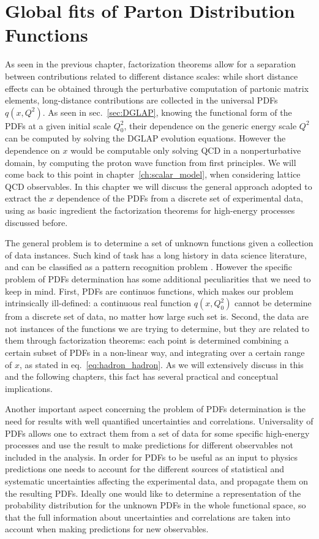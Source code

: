 \chapter{Global fits of Parton Distribution Functions} 
\label{ch:nnpdf_methodology}
As seen in the previous chapter, factorization theorems allow for a separation between contributions 
related to different distance scales: while short distance
effects can be obtained through the perturbative computation of partonic matrix elements, 
long-distance contributions are collected in the universal PDFs $q\left(x,Q^2\right)$. As seen in sec.~\ref{sec:DGLAP},
knowing the functional form of the PDFs at a given initial scale $Q_0^2$, 
their dependence on the generic energy scale $Q^2$ can be computed by solving the DGLAP evolution equations.
However the dependence on $x$ would be computable only solving QCD in a nonperturbative domain, 
by computing the proton wave function from first principles. We will come back to 
this point in chapter~\ref{ch:scalar_model}, when considering lattice QCD observables.
In this chapter we will discuss the general approach adopted to extract the $x$ dependence of the PDFs
from a discrete set of experimental data, using as basic ingredient the factorization theorems for high-energy processes
discussed before.

%
The general problem is to determine a set of unknown functions given
a collection of data instances. Such kind of task has a long history in data science literature, 
and can be classified as a pattern recognition problem \cite{Forte:2020yip}.
However the specific problem of PDFs determination has some additional peculiarities that we need to keep in mind.
First, PDFs are continuos functions, which makes our problem intrinsically ill-defined: a continuous real function
$q\left(x,Q_0^2\right)$ cannot be determine from a discrete set of data, no matter how large such set is.
Second, the data are not instances of the functions we are trying to determine, but they are related to 
them through factorization theorems: each point is determined combining a certain subset of PDFs in a non-linear way,
and integrating over a certain range of $x$, as stated in eq.~\eqref{eq:hadron_hadron}. 
As we will extensively discuss in this and the following chapters,
this fact has several practical and conceptual implications.

%
Another important aspect concerning the problem of PDFs determination 
is the need for results with well quantified uncertainties and correlations.
Universality of PDFs allows one to extract them from a set of data for some specific high-energy processes
and use the result to make predictions for different observables not included in the analysis.
In order for PDFs to be useful as an input to physics predictions one needs to account for the different
sources of statistical and systematic uncertainties affecting the experimental data, and
propagate them on the resulting PDFs.
Ideally one would like to determine a representation 
of the probability distribution for the unknown PDFs in the whole functional space, so that the full information
about uncertainties and correlations are taken into account when making predictions for new observables.

